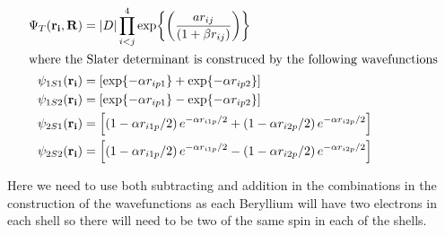		\begin{align}
		\Psi_T(\vb{r_i}, \vb{R}) &= |D| \prod_{i<j}^{4}\exp{\left(\frac{a r_{ij}}{(1+\beta r_{ij})}\right)} \\
		\intertext{where the Slater determinant is construced by the following wavefunctions}
		\psi_{1S1}(\vb{r_i}) &=  \left[ \exp{-\alpha r_{ip1}} + \exp{-\alpha r_{ip2}} \right] \\
		\psi_{1S2}(\vb{r_i}) &=  \left[ \exp{-\alpha r_{ip1}} - \exp{-\alpha r_{ip2}} \right] \\
		\psi_{2S1}(\vb{r_i}) &=	\left[\left(1-\alpha r_{i1p}/2\right)e^{-\alpha r_{i1p}/2} + \left(1-\alpha r_{i2p}/2\right)e^{-\alpha r_{i2p}/2}  \right] \\
		\psi_{2S2}(\vb{r_i}) &=	\left[\left(1-\alpha r_{i1p}/2\right)e^{-\alpha r_{i1p}/2} - \left(1-\alpha r_{i2p}/2\right)e^{-\alpha r_{i2p}/2}  \right]
		\end{align}

		Here we need to use both subtracting and addition in the combinations in the construction of the wavefunctions as each Beryllium will have two electrons in each shell so there will need to be two of the same spin in each of the shells.

